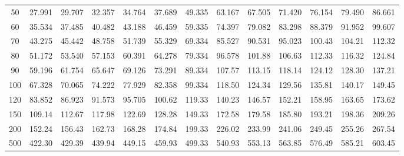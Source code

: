 \begin{table}[htbp]
\begin{tabular}{ccccccccccccc}
		50  & 27.991 & 29.707 & 32.357 & 34.764 & 37.689 & 49.335 & 63.167 & 67.505 & 71.420 & 76.154 & 79.490 & 86.661 \\
		60  & 35.534 & 37.485 & 40.482 & 43.188 & 46.459 & 59.335 & 74.397 & 79.082 & 83.298 & 88.379 & 91.952 & 99.607 \\
		70  & 43.275 & 45.442 & 48.758 & 51.739 & 55.329 & 69.334 & 85.527 & 90.531 & 95.023 & 100.43 & 104.21 & 112.32 \\
		80  & 51.172 & 53.540 & 57.153 & 60.391 & 64.278 & 79.334 & 96.578 & 101.88 & 106.63 & 112.33 & 116.32 & 124.84 \\
		90  & 59.196 & 61.754 & 65.647 & 69.126 & 73.291 & 89.334 & 107.57 & 113.15 & 118.14 & 124.12 & 128.30 & 137.21 \\[5pt]
		100 & 67.328 & 70.065 & 74.222 & 77.929 & 82.358 & 99.334 & 118.50 & 124.34 & 129.56 & 135.81 & 140.17 & 149.45 \\
		120 & 83.852 & 86.923 & 91.573 & 95.705 & 100.62 & 119.33 & 140.23 & 146.57 & 152.21 & 158.95 & 163.65 & 173.62 \\
		150 & 109.14 & 112.67 & 117.98 & 122.69 & 128.28 & 149.33 & 172.58 & 179.58 & 185.80 & 193.21 & 198.36 & 209.26 \\
		200 & 152.24 & 156.43 & 162.73 & 168.28 & 174.84 & 199.33 & 226.02 & 233.99 & 241.06 & 249.45 & 255.26 & 267.54 \\
		500 & 422.30 & 429.39 & 439.94 & 449.15 & 459.93 & 499.33 & 540.93 & 553.13 & 563.85 & 576.49 & 585.21 & 603.45 \\
		\hline
	\end{tabular}
\end{table}